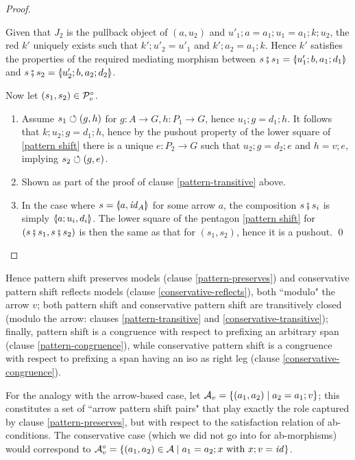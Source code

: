\begin{fullorname}
\begin{proof}
\begin{enumerate}[topsep=\smallskipamount]
\begin{center}
\end{center}
%
Given that $J_2$ is the pullback object of $(a,u_2)$ and $u'_1;a=a_1;u_1=a_1;k;u_2$, the red $k'$ uniquely exists such that $k';u'_2=u'_1$ and $k';a_2=a_1;k$. Hence $k'$ satisfies the properties of the required mediating morphism between $s\spcomp s_1=\spanof{u'_1;b}{a_1;d_1}$ and $s\spcomp s_2=\spanof{u'_2;b}{a_2;d_2}$.
\end{enumerate}
%
Now let $(s_1,s_2)\in \mathcal{P}^\circ_v$.
%
\begin{enumerate}[resume,topsep=\smallskipamount]
\item Assume $s_1\circlearrowleft (g,h)$ for $g:A\to G,h:P_1\to G$, hence $u_1;g=d_1;h$. It follows that $k;u_2;g=d_1;h$, hence by the pushout property of the lower square of \eqref{pattern shift} there is a unique $e:P_2\to G$ such that $u_2;g=d_2;e$ and $h=v;e$, implying $s_2\circlearrowleft (g,e)$.

\item Shown as part of the proof of clause \ref{pattern-transitive} above.

\item In the case where $s=\spanof{a}{\id_A}$ for some arrow $a$, the composition $s \fatsemi s_i$ is simply $\spanof{a;u_i}{d_i}$. The lower square of the pentagon \eqref{pattern shift} for $(s\fatsemi s_1,s\fatsemi s_2)$ is then the same as that for $(s_1,s_2)$, hence it is a pushout.
\qed
\end{enumerate}
\end{proof}
\end{fullorname}
%
\iffull
Hence pattern shift preserves models (clause \ref{pattern-preserves}) and conservative pattern shift reflects models (clause \ref{conservative-reflects}), both ``modulo" the arrow $v$; both pattern shift and conservative pattern shift are transitively closed (modulo the arrow: clauses \ref{pattern-transitive} and \ref{conservative-transitive}); finally, pattern shift is a congruence with respect to prefixing an arbitrary span (clause \ref{pattern-congruence}), while conservative pattern shift is a congruence with respect to prefixing a span having an iso as right leg  (clause \ref{conservative-congruence}).

\fi
For the analogy with the arrow-based case, let $\mathcal{A}_v=\{{(a_1,a_2)\mid a_2=a_1;v}\}$; this constitutes a set of ``arrow pattern shift pairs" that play exactly the role captured by clause \ref{pattern-preserves}, but with respect to the satisfaction relation of ab-conditions. The conservative case (which we did not go into for ab-morphisms) would correspond to $\mathcal{A}^\circ_v=\{{(a_1,a_2)\in \mathcal{A}\mid a_1=a_2;x \text{ with } x;v=\mathit{id}}\}$.

